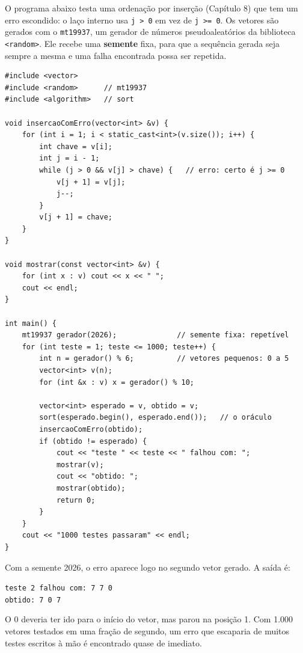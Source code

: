 O programa abaixo testa uma ordenação por inserção (Capítulo 8) que tem um erro escondido: o laço interno usa \texttt{j > 0} em vez de \texttt{j >= 0}. Os vetores são gerados com o \texttt{mt19937}, um gerador de números pseudoaleatórios da biblioteca \texttt{<random>}. Ele recebe uma \textbf{semente} fixa, para que a sequência gerada seja sempre a mesma e uma falha encontrada possa ser repetida.

\begin{codigo}
\begin{Verbatim}[breaklines=true, breaksymbolleft={}, fontsize=\footnotesize]
#include <vector>
#include <random>      // mt19937
#include <algorithm>   // sort

void insercaoComErro(vector<int> &v) {
    for (int i = 1; i < static_cast<int>(v.size()); i++) {
        int chave = v[i];
        int j = i - 1;
        while (j > 0 && v[j] > chave) {   // erro: certo é j >= 0
            v[j + 1] = v[j];
            j--;
        }
        v[j + 1] = chave;
    }
}

void mostrar(const vector<int> &v) {
    for (int x : v) cout << x << " ";
    cout << endl;
}

int main() {
    mt19937 gerador(2026);              // semente fixa: repetível
    for (int teste = 1; teste <= 1000; teste++) {
        int n = gerador() % 6;          // vetores pequenos: 0 a 5
        vector<int> v(n);
        for (int &x : v) x = gerador() % 10;

        vector<int> esperado = v, obtido = v;
        sort(esperado.begin(), esperado.end());   // o oráculo
        insercaoComErro(obtido);
        if (obtido != esperado) {
            cout << "teste " << teste << " falhou com: ";
            mostrar(v);
            cout << "obtido: ";
            mostrar(obtido);
            return 0;
        }
    }
    cout << "1000 testes passaram" << endl;
}
\end{Verbatim}
\end{codigo}

Com a semente 2026, o erro aparece logo no segundo vetor gerado. A saída é:

\begin{center}
\texttt{teste 2 falhou com: 7 7 0} \\
\texttt{obtido: 7 0 7}
\end{center}

O 0 deveria ter ido para o início do vetor, mas parou na posição 1. Com 1.000 vetores testados em uma fração de segundo, um erro que escaparia de muitos testes escritos à mão é encontrado quase de imediato.

